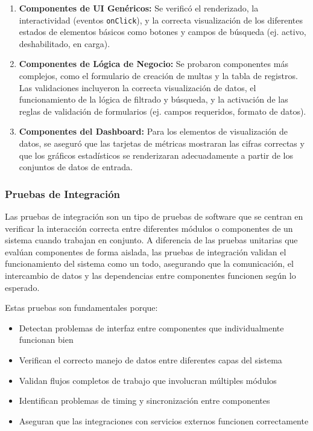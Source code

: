\begin{enumerate}
    \item \textbf{Componentes de UI Genéricos:} Se verificó el renderizado, la interactividad (eventos \texttt{onClick}), y la correcta visualización de los diferentes estados de elementos básicos como botones y campos de búsqueda (ej. activo, deshabilitado, en carga).
    
    \item \textbf{Componentes de Lógica de Negocio:} Se probaron componentes más complejos, como el formulario de creación de multas y la tabla de registros. Las validaciones incluyeron la correcta visualización de datos, el funcionamiento de la lógica de filtrado y búsqueda, y la activación de las reglas de validación de formularios (ej. campos requeridos, formato de datos).
    
    \item \textbf{Componentes del Dashboard:} Para los elementos de visualización de datos, se aseguró que las tarjetas de métricas mostraran las cifras correctas y que los gráficos estadísticos se renderizaran adecuadamente a partir de los conjuntos de datos de entrada.
\end{enumerate}

\subsubsection{Pruebas de Integración}

Las pruebas de integración son un tipo de pruebas de software que se centran en verificar la interacción correcta entre diferentes módulos o componentes de un sistema cuando trabajan en conjunto. A diferencia de las pruebas unitarias que evalúan componentes de forma aislada, las pruebas de integración validan el funcionamiento del sistema como un todo, asegurando que la comunicación, el intercambio de datos y las dependencias entre componentes funcionen según lo esperado.

Estas pruebas son fundamentales porque:
\begin{itemize}
    \item Detectan problemas de interfaz entre componentes que individualmente funcionan bien
    \item Verifican el correcto manejo de datos entre diferentes capas del sistema
    \item Validan flujos completos de trabajo que involucran múltiples módulos
    \item Identifican problemas de timing y sincronización entre componentes
    \item Aseguran que las integraciones con servicios externos funcionen correctamente
\end{itemize}

